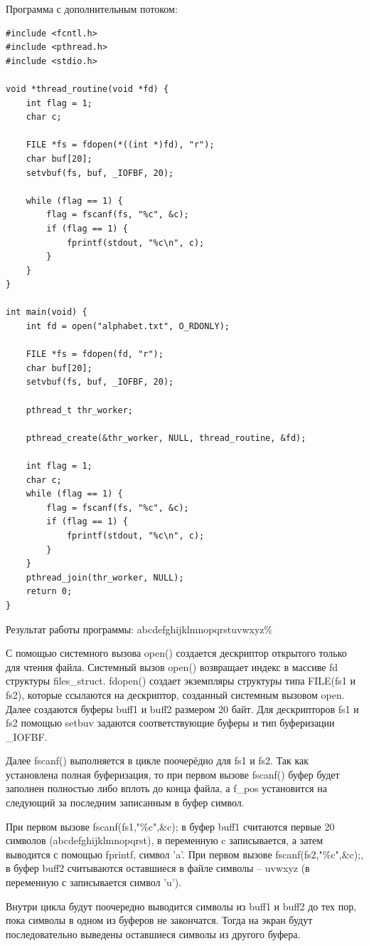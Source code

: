Программа с дополнительным потоком:\newpage
\begin{lstlisting}
#include <fcntl.h>
#include <pthread.h>
#include <stdio.h>

void *thread_routine(void *fd) {
	int flag = 1;
	char c;
	
	FILE *fs = fdopen(*((int *)fd), "r");
	char buf[20];
	setvbuf(fs, buf, _IOFBF, 20);
	
	while (flag == 1) {
		flag = fscanf(fs, "%c", &c);
		if (flag == 1) {
			fprintf(stdout, "%c\n", c);
		}
	}
}

int main(void) {
	int fd = open("alphabet.txt", O_RDONLY);
	
	FILE *fs = fdopen(fd, "r");
	char buf[20];
	setvbuf(fs, buf, _IOFBF, 20);
	
	pthread_t thr_worker;
	
	pthread_create(&thr_worker, NULL, thread_routine, &fd);
	
	int flag = 1;
	char c;
	while (flag == 1) {
		flag = fscanf(fs, "%c", &c);
		if (flag == 1) {
			fprintf(stdout, "%c\n", c);
		}
	}
	pthread_join(thr_worker, NULL);
	return 0;
}
\end{lstlisting}

Результат работы программы:
abcdefghijklmnopqrstuvwxyz\%

\newpage
С помощью системного вызова open() создается дескриптор открытого только для
чтения файла. Системный вызов open() возвращает индекс в массиве fd структуры
files\_struct. fdopen() создает экземпляры структуры типа FILE(fs1 и fs2),
которые ссылаются на дескриптор, созданный системным вызовом open.
Далее создаются буферы	buff1 и buff2 размером 20 байт. Для дескрипторов fs1 и
fs2 помощью setbuv задаются соответствующие буферы и тип буферизации
\_IOFBF.

Далее fscanf() выполняется в цикле поочерёдно для fs1 и  fs2. Так как
установлена полная буферизация, то при первом вызове fscanf() буфер будет
заполнен полностью либо вплоть до конца файла, а f\_pos установится на
следующий за последним записанным в буфер символ.

При первом вызове fscanf(fs1,"\%c",\&c); в буфер buff1 считаются первые 20
символов (abcdefghijklmnopqrst), в переменную c записывается, а затем выводится
с помощью fprintf, символ 'a'. При первом вызове fscanf(fs2,"\%c",\&c);, в
буфер buff2 считываются оставшиеся в файле символы – uvwxyz (в переменную с
записывается символ 'u').

Внутри цикла будут поочередно выводится символы из buff1 и buff2 до тех пор,
пока символы в одном из буферов не закончатся. Тогда на экран будут
последовательно выведены оставшиеся символы из другого буфера.

